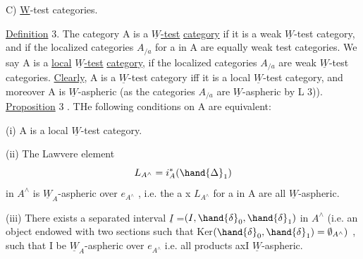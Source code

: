 
C)    \underline{W}-test categories.

\uline{Definition} 3.  The category A is a  \uline{$\underline{W}$-test} \uline{category} if it is a 
weak $\underline{W}$-test category,  and if the localized categories $A_{/a}$  for a in
A  are equally weak test categories. We say A is a \uline{local} \uline{$\underline{W}$-test} \uline{category},
if the localized categories $A_{/a}$ are weak $\underline{W}$-test categories.
\uline{Clearly}, A is a $\underline{W}$-test category iff it is a local $\underline{W}$-test category,
and moreover A is $\underline{W}$-aspheric  (as the categories $A_{/a}$  are $\underline{W}$-aspheric
by L 3)). 
\uline{Proposition} 3 .  THe following conditions on A are equivalent:

(i)  A is a local $\underline{W}$-test category.

(ii)  The  Lawvere element
\[ L_{A^\wedge} = i^*_A(\hand{\Delta}_1) \]
in $A^\wedge$ is $\underline{W}_A$-aspheric over $e_{A^\wedge}$ ,  i.e. the   a x $L_{A^\wedge}$ for a in A
are all $\underline{W}$-aspheric.

(iii)  There exists a separated interval $\underline{I}$ =$(I,\hand{\delta}_0,\hand{\delta}_1)$ in $A^\wedge$ 
(i.e. an object endowed with two sections  such that Ker$(\hand{\delta}_0,\hand{\delta}_1) = \emptyset_{A^\wedge})$ ,
such that I be $\underline{W}_A$-aspheric over $e_{A^\wedge}$ i.e. all products axI  $\underline{W}$-aspheric.

